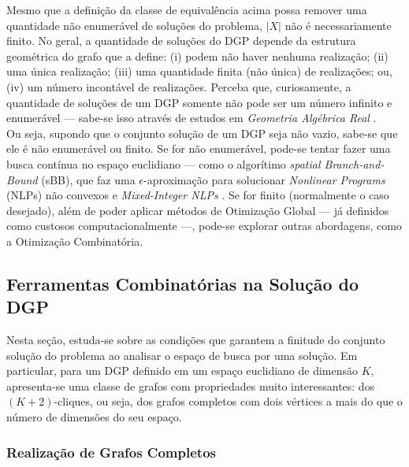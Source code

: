 Mesmo que a definição da classe de equivalência acima possa remover uma quantidade não enumerável de soluções do problema, $|X|$ não é necessariamente finito. No geral, a quantidade de soluções do DGP depende da estrutura geométrica do grafo que a define: (i) podem não haver nenhuma realização; (ii) uma única realização; (iii) uma quantidade finita (não única) de realizações; ou, (iv) um número incontável de realizações. Perceba que, curiosamente, a quantidade de soluções de um DGP somente não pode ser um número infinito e enumerável --- sabe-se isso através de estudos em \textit{Geometria Algébrica Real} \cite{benedettireal}.\\
 
Ou seja, supondo que o conjunto solução de um DGP seja não vazio, sabe-se que ele é não enumerável ou finito. Se for não enumerável, pode-se tentar fazer uma busca contínua no espaço euclidiano --- como o algorítimo \textit{spatial Branch-and-Bound} (sBB), que faz uma $\epsilon$-aproximação para solucionar \textit{Nonlinear Programs} (NLPs) não convexos e \textit{Mixed-Integer NLPs} \cite{carlileGDandAplications}. Se for finito (normalmente o caso desejado), além de poder aplicar métodos de Otimização Global --- já definidos como custosos computacionalmente ---, pode-se explorar outras abordagens, como a Otimização Combinatória.

\subsection{Ferramentas Combinatórias na Solução do DGP}

Nesta seção, estuda-se sobre as condições que garantem a finitude do conjunto solução do problema ao analisar o espaço de busca por uma solução. Em particular, para um DGP definido em um espaço euclidiano de dimensão $K$, apresenta-se uma classe de grafos com propriedades muito interessantes: dos $(K+2)$-cliques, ou seja, dos grafos completos com dois vértices a mais do que o número de dimensões do seu espaço.

\subsubsection{Realização de Grafos Completos}


